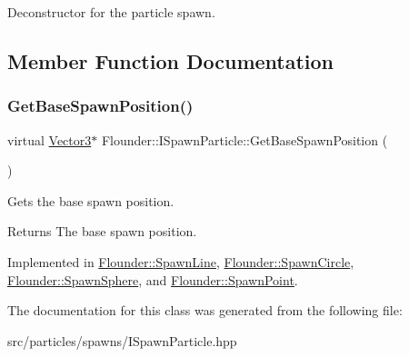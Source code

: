 Deconstructor for the particle spawn. 



\subsection{Member Function Documentation}
\mbox{\label{class_flounder_1_1_i_spawn_particle_ac4adda7b65431918162f52ac1f4ce57d}} 
\subsubsection{\texorpdfstring{Get\+Base\+Spawn\+Position()}{GetBaseSpawnPosition()}}
{\footnotesize\ttfamily virtual \hyperlink{class_flounder_1_1_vector3}{Vector3}$\ast$ Flounder\+::\+I\+Spawn\+Particle\+::\+Get\+Base\+Spawn\+Position (\begin{DoxyParamCaption}{ }\end{DoxyParamCaption})\hspace{0.3cm}{\ttfamily [pure virtual]}}



Gets the base spawn position. 

\begin{DoxyReturn}{Returns}
The base spawn position. 
\end{DoxyReturn}


Implemented in \hyperlink{class_flounder_1_1_spawn_line_a02c7783fe92ef1845953d5459f7bad7b}{Flounder\+::\+Spawn\+Line}, \hyperlink{class_flounder_1_1_spawn_circle_a8f6d8449b4608abf4e45d9e045f20ae5}{Flounder\+::\+Spawn\+Circle}, \hyperlink{class_flounder_1_1_spawn_sphere_aed154e6e7cf50de491fa881e952dc487}{Flounder\+::\+Spawn\+Sphere}, and \hyperlink{class_flounder_1_1_spawn_point_a0bb1e9ba2fd2bce734de6dbb16246fd4}{Flounder\+::\+Spawn\+Point}.



The documentation for this class was generated from the following file\+:\begin{DoxyCompactItemize}
\item 
src/particles/spawns/I\+Spawn\+Particle.\+hpp\end{DoxyCompactItemize}
